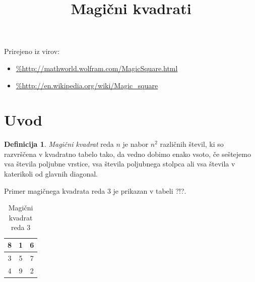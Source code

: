 \documentclass[a4paper,12pt]{article}
\title{Magični kvadrati}
\date{}
\theoremstyle{definition}
\newtheorem{definicija}{Definicija}
\newcommand{\pojem}[1]{\emph{\color{purple}#1}}
\begin{document}
\maketitle



Prirejeno iz virov:

\begin{itemize}
   \item \url{%http://mathworld.wolfram.com/MagicSquare.html}
   \item \url{%http://en.wikipedia.org/wiki/Magic_square}
\end{itemize}

\tableofcontents


\newpage

\section{Uvod}

\begin{definicija}
   \pojem{Magični kvadrat} reda $n$ je nabor $n^2$ različnih števil,
   ki so razvrščena v kvadratno tabelo tako, da vedno dobimo enako vsoto,
   če seštejemo vsa števila poljubne vrstice, vsa števila poljubnega
   stolpca ali vsa števila v katerikoli od glavnih diagonal.
\end{definicija}

Primer magičnega kvadrata reda 3 je prikazan v tabeli ?!?.

\begin{table}[!ht]
   \centering
   \caption{Magični kvadrat reda 3}
   \begin{tabular}{|c|c|c|}\hline
8 & 1 & 6 \\\hline
3 & 5 & 7 \\\hline
4 & 9 & 2 \\\hline
   \end{tabular}
\end{table}
\end{document}
